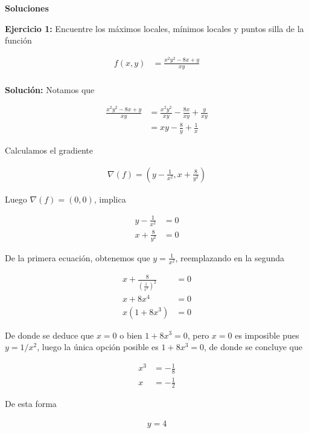 \documentclass[a4paper]{article}
\begin{document}
\begin{center}
    \Large{\textbf{Soluciones}}
\end{center}

\setlength{\parindent}{0cm}


\textbf{Ejercicio 1:} Encuentre los máximos locales, mínimos locales y puntos silla de la función

\begin{align*}
    f(x,y) &=  \frac{x^2y^2-8x+y}{xy}\\
\end{align*}

\textbf{Solución: } Notamos que

\begin{align*}
    \frac{x^2y^2-8x+y}{xy} &= \frac{x^2y^2}{xy}-\frac{8x}{xy}+\frac{y}{xy} \\
    &= xy-\frac{8}{y}+\frac{1}{x}
\end{align*}

Calculamos el gradiente


\begin{align*}
    \nabla(f) = \left( y-\frac{1}{x^2}, x+\frac{8}{y^2} \right)
\end{align*}

Luego $\nabla(f)= (0,0)$, implica

\begin{align*}
     y-\frac{1}{x^2} &= 0 \\
     x+\frac{8}{y^2} &= 0
\end{align*}

De la primera ecuación, obtenemos que $\displaystyle y = \frac{1}{x^2}$, reemplazando en la segunda


\begin{align*}
    x+\frac{8}{\left(\frac{1}{x^2}\right)^2} &= 0 \\
    x+8x^4 &= 0 \\
    x(1+8x^3) &= 0
\end{align*}

De donde se deduce que $x=0$ o bien $1+8x^3=0$, pero $x=0$ es imposible pues $y=1/x^2$, luego la única opción posible es $1+8x^3=0$, de donde se concluye que

\begin{align*}
    x^3 &= -\frac{1}{8} \\
    x & = -\frac{1}{2}
\end{align*}

De esta forma 

\begin{align*}
    y=4
\end{align*}
\end{document}
